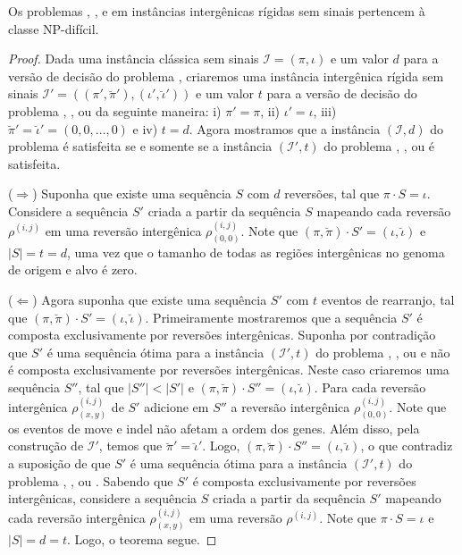 \begin{theorem}\label{theorem:YARJETHG}
Os problemas \SbIR{}, \SbIRI{}, \SbIRM{} e \SbIRMI{} em instâncias intergênicas rígidas sem sinais pertencem à classe NP-difícil.
\end{theorem}
\begin{proof}
Dada uma instância clássica sem sinais $\mathcal{I}=(\pi,\iota)$ e um valor $d$ para a versão de decisão do problema \SbR, criaremos uma instância intergênica rígida sem sinais $\mathcal{I'}=((\pi',\breve\pi'),(\iota',\breve\iota'))$ e um valor $t$ para a versão de decisão do problema \SbIR{}, \SbIRI{}, \SbIRM{} ou \SbIRMI{} da seguinte maneira: i) $\pi' = \pi$, ii) $\iota' = \iota$, iii) $\breve\pi' = \breve\iota' = (0,0,\dots,0)$ e iv) $t = d$. Agora mostramos que a instância $(\mathcal{I},d)$ do problema \SbR{} é satisfeita se e somente se a instância $(\mathcal{I'},t)$ do problema \SbIR{}, \SbIRI{}, \SbIRM{} ou \SbIRMI{} é satisfeita.

($\Rightarrow$) Suponha que existe uma sequência $S$ com $d$ reversões, tal que $\pi \cdot S = \iota$. Considere a sequência $S'$ criada a partir da sequência $S$ mapeando cada reversão $\rho^{(i,j)}$ em uma reversão intergênica $\rho^{(i,j)}_{(0,0)}$. Note que $(\pi,\breve\pi) \cdot S' = (\iota,\breve\iota)$ e $|S| = t = d$, uma vez que o tamanho de todas as regiões intergênicas no genoma de origem e alvo é zero.

($\Leftarrow$) Agora suponha que existe uma sequência $S'$ com $t$ eventos de rearranjo, tal que $(\pi,\breve\pi) \cdot S' = (\iota,\breve\iota)$. Primeiramente mostraremos que a sequência $S'$ é composta exclusivamente por reversões intergênicas. Suponha por contradição que $S'$ é uma sequência ótima para a instância $(\mathcal{I'},t)$ do problema \SbIR{}, \SbIRI{}, \SbIRM{} ou \SbIRMI{} e não é composta exclusivamente por reversões intergênicas. Neste caso criaremos uma sequência $S''$, tal que  $|S''| < |S'|$ e $(\pi,\breve\pi) \cdot S'' = (\iota,\breve\iota)$. Para cada reversão intergênica $\rho^{(i,j)}_{(x,y)}$ de $S'$ adicione em $S''$ a reversão intergênica $\rho^{(i,j)}_{(0,0)}$. Note que os eventos de move e indel não afetam a ordem dos genes. Além disso, pela construção de $\mathcal{I'}$, temos que $\breve\pi' = \breve\iota'$. Logo, $(\pi,\breve\pi) \cdot S'' = (\iota,\breve\iota)$, o que contradiz a suposição de que $S'$ é uma sequência ótima para a instância $(\mathcal{I'},t)$ do problema \SbIR{}, \SbIRI{}, \SbIRM{} ou \SbIRMI{}. Sabendo que $S'$ é composta exclusivamente por reversões intergênicas, considere a sequência $S$ criada a partir da sequência $S'$ mapeando cada reversão intergênica $\rho^{(i,j)}_{(x,y)}$ em uma reversão $\rho^{(i,j)}$. Note que $\pi \cdot S = \iota$ e $|S| = d = t$. Logo, o teorema segue.
\end{proof}

